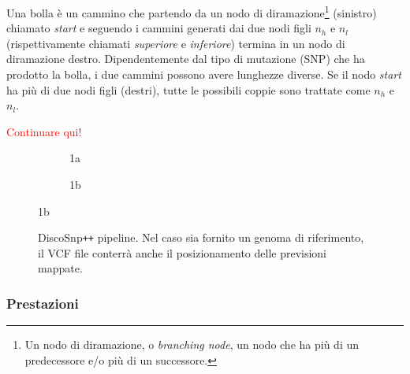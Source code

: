 \documentclass[../main.tex]{subfiles}
\begin{document}
\begin{definition}
Una bolla \`e un cammino che partendo da un nodo di diramazione\footnote{Un nodo di diramazione, o \textit{branching node}, un nodo che ha più di un predecessore e/o più di un successore.} (sinistro) chiamato \textit{start} e seguendo i cammini generati dai due nodi figli $n_h$ e $n_l$ (rispettivamente chiamati \textit{superiore} e \textit{inferiore}) termina in un nodo di diramazione destro. Dipendentemente dal tipo di mutazione (SNP) che ha prodotto la bolla, i due cammini possono avere lunghezze diverse. Se il nodo \textit{start} ha più di due nodi figli (destri), tutte le possibili coppie sono trattate come $n_h$ e $n_l$.
\end{definition}

\textcolor{red}{Continuare qui!}

\begin{figure}[ht]
\begin{subfigure}{.5\textwidth}
  \centering
  \caption{1a}
  \label{fig:sfig1}
\end{subfigure}
\begin{subfigure}{.5\textwidth}
  \centering
  \caption{1b}
  \label{fig:sfig2}
\end{subfigure}
\end{figure}

\begin{figure}[h]
	\centering
  	\captionsetup{justification=centering}
  	\caption{DiscoSnp\texttt{++} pipeline. Nel caso sia fornito un genoma di riferimento, il VCF file conterrà anche il posizionamento delle previsioni mappate.}
  	\label{fig:pipe1}
\end{figure}

\subsubsection{Prestazioni}
\end{document}
